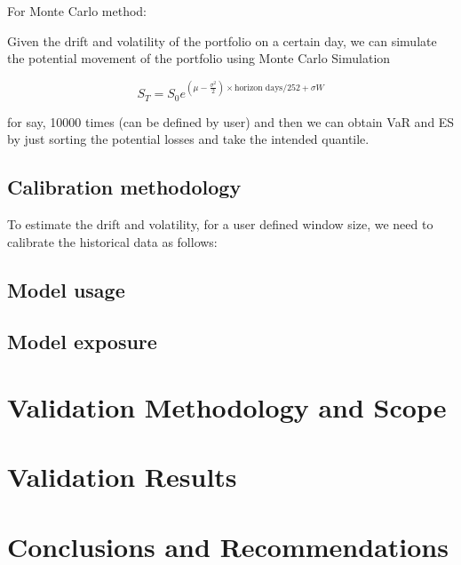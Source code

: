 \documentclass[letterpaper,11pt, oneside]{layout}
\begin{document}
For Monte Carlo method:

Given the drift and volatility of the portfolio on a certain day, we can simulate the potential movement of the portfolio using Monte Carlo Simulation 

\begin{equation}
S_T=S_0 e^{(\mu-\frac{\sigma^2}{2})\times \text{horizon days}/252+\sigma W}
\end{equation}

for say, 10000 times (can be defined by user) and then we can obtain VaR and ES by just sorting the potential losses and take the intended quantile.

\section{Calibration methodology}
\label{sec:md:cm}

To estimate the drift and volatility, for a user defined window size, we need to calibrate the historical data as follows:

\section{Model usage}
\label{sec:md:mu}

\section{Model exposure}
\label{sec:md:me}


\begingroup
\renewcommand{\clearpage}{}
\chapter{Validation Methodology and Scope}
\label{chap:vms}
\endgroup


\begingroup
\renewcommand{\clearpage}{}
\chapter{Validation Results}
\label{chap:vr}
\endgroup


\begingroup
\renewcommand{\clearpage}{}
\chapter{Conclusions and Recommendations}
\label{chap:cr}
\endgroup


\appendix
\renewcommand\theequation{\Alph{chapter}--\arabic{equation}}
\renewcommand\thefigure{\Alph{chapter}--\arabic{figure}}
\renewcommand\thetable{\Alph{chapter}--\arabic{table}}

%
%


\backmatter

%

\end{document}
